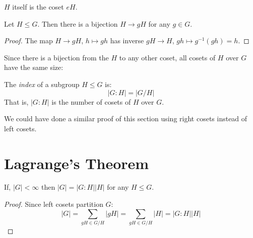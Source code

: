 \documentclass[../main.tex]{subfiles}
\begin{document}
\begin{remark}[Note]
  $H$ itself is the coset $eH$.
\end{remark}
\begin{lemma}
  Let $H \leq G$.
  Then there is a bijection $H \to gH$ for any $g \in G$.
\end{lemma}
\begin{proof}
  The map $H \to gH$, $h \mapsto gh$ has inverse $gH \to H$, $gh \mapsto g^{-1}(gh) = h$.
\end{proof}
Since there is a bijection from the $H$ to any other coset, all cosets of $H$ over $G$ have the same size:
\begin{center}
\end{center}

\begin{definition}[Index]
  The \textit{index} of a subgroup $H \leq G$ is:
  \[
    |G : H| = |G / H|
  \]
  That is, $|G : H|$ is the number of cosets of $H$ over $G$.
\end{definition}
\begin{remark}
  We could have done a similar proof of this section using right cosets instead of left cosets.
\end{remark}

\section{Lagrange's Theorem}
\begin{theorem}
  If, $|G| < \infty$ then $|G| = |G : H| |H|$ for any $H \leq G$.
  \label{lagrangesTheorem}
\end{theorem}
\begin{proof}
  Since left cosets partition $G$:
  \[
    |G| = \sum_{gH \in G / H} |gH| = \sum_{gH \in G / H} |H| = |G : H||H|
  \]
\end{proof}
\end{document}
